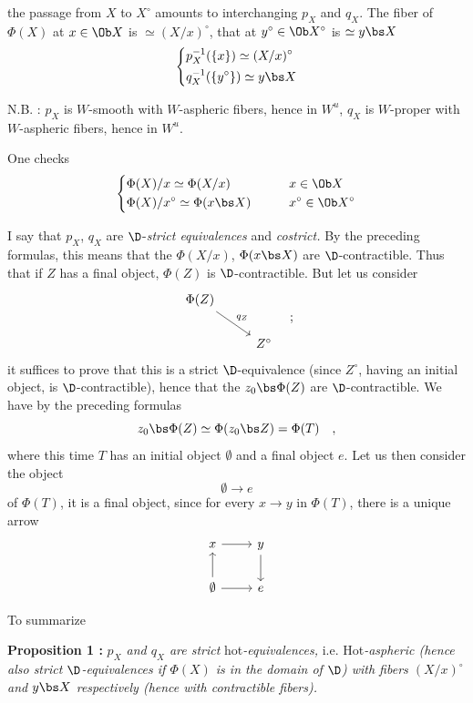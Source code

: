 the passage from $X$ to $X^\circ$ amounts to interchanging $p_X$ and $q_X$. The fiber of $\Phi(X)$ at $x \in \Ob X$ is $\simeq (X/x)^\circ$, that at $y^\circ \in \Ob X^\circ$ is $\simeq y\bs X$
\[
\left\{
\begin{aligned}
&p_X^{-1}(\{x\}) \simeq (X/x)^\circ\\
&q_X^{-1}(\{y^\circ\}) \simeq y\bs X
\end{aligned}
\right.
\]

N.B. : $p_X$ is $W$-smooth with $W$-aspheric fibers, hence in $W^u$, $q_X$ is $W$-proper with $W$-aspheric fibers, hence in $W^u$.


One checks
\[
\left\{
\begin{aligned}
&\Phi(X)/x \simeq \Phi(X/x) &\qquad& x \in \Ob X\\
&\Phi(X)/x^\circ \simeq \Phi(x\bs X) &\qquad& x^\circ \in \Ob X^\circ
\end{aligned}
\right.
\]

I say that $p_X$, $q_X$ are $\D$-\textit{strict equivalences} and \textit{costrict.} By the preceding formulas, this means that the $\Phi(X/x)$, $\Phi(x\bs X)$ are $\D$-contractible. Thus that if $Z$ has a final object, $\Phi(Z)$ is $\D$-contractible. But let us consider
\[
\begin{tikzcd}
\Phi(Z) \arrow[dr, "q_Z"] & \\
& Z^\circ
\end{tikzcd}
\quad ;
\]
it suffices to prove that this is a strict $\D$-equivalence (since $Z^\circ$, having an initial object, is $\D$-contractible), hence that the $z_0\bs\Phi(Z)$ are $\D$-contractible. We have by the preceding formulas %
\[
z_0\bs\Phi(Z) \simeq \Phi(z_0\bs Z) = \Phi(T) \quad ,
\]
where this time $T$ has an initial object $\emptyset$ and a final object $e$. Let us then consider the object
\[
\emptyset \longrightarrow e
\]
of $\Phi(T)$, it is a final object, since for every $x \to y$ in $\Phi(T)$, there is a unique arrow
\[
\begin{tikzcd}
x \arrow[r] & y \arrow[d] \\
\emptyset \arrow[u] \arrow[r] & e
\end{tikzcd}
\]


To summarize

\textbf{Proposition 1 :} \textit{$p_X$ and $q_X$ are strict} \textsf{hot}\textit{-equivalences,} i.e. \textsf{Hot}\textit{-aspheric (hence also strict $\D$-equivalences if $\Phi(X)$ is in the domain of $\D$) with fibers $(X/x)^\circ$ and $y\bs X$ respectively (hence with contractible fibers).}

